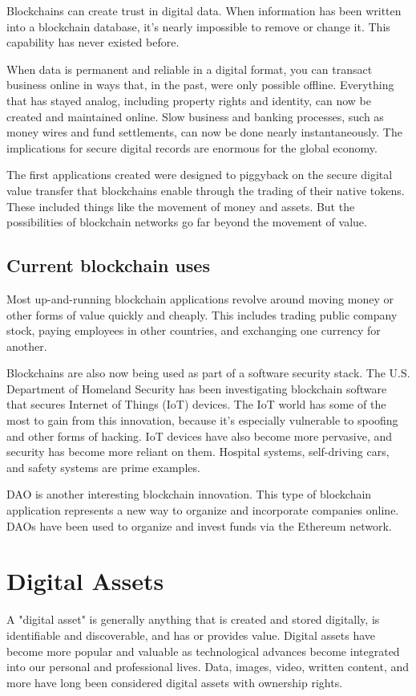 \documentclass[MSE,Master,english]{twbook}%
\begin{document}
Blockchains can create trust in digital data. When information has been written into a blockchain database, it's nearly impossible to remove or change it. This capability has never existed before. 

When data is permanent and reliable in a digital format, you can transact business online in ways that, in the past, were only possible offline. Everything that has stayed analog, including property rights and identity, can now be created and maintained online. Slow business and banking processes, such as money wires and fund settlements, can now be done nearly instantaneously. The implications for secure digital records are enormous for the global economy. 

The first applications created were designed to piggyback on the secure digital value transfer that blockchains enable through the trading of their native tokens. These included things like the movement of money and assets. But the possibilities of blockchain networks go far beyond the movement of value.

\subsection{Current blockchain uses}

Most up-and-running blockchain applications revolve around moving money or other forms of value quickly and cheaply. This includes trading public company stock, paying employees in other countries, and exchanging one currency for another. 

Blockchains are also now being used as part of a software security stack. The U.S. Department of Homeland Security has been investigating blockchain software that secures Internet of Things (IoT) devices. The IoT world has some of the most to gain from this innovation, because it's especially vulnerable to spoofing and other forms of hacking. IoT devices have also become more pervasive, and security has become more reliant on them. Hospital systems, self-driving cars, and safety systems are prime examples. 

\ac{DAO} is another interesting blockchain innovation. This type of blockchain application represents a new way to organize and incorporate companies online. DAOs have been used to organize and invest funds via the Ethereum network.

\section{Digital Assets}
A "digital asset"\cite{digAssets} is generally anything that is created and stored digitally, is identifiable and discoverable, and has or provides value. Digital assets have become more popular and valuable as technological advances become integrated into our personal and professional lives. Data, images, video, written content, and more have long been considered digital assets with ownership rights.
\end{document}
